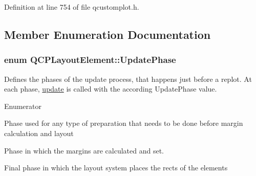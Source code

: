 Definition at line 754 of file qcustomplot.\+h.



\subsection{Member Enumeration Documentation}
\hypertarget{class_q_c_p_layout_element_a0d83360e05735735aaf6d7983c56374d}{}
\subsubsection[{Update\+Phase}]{\setlength{\rightskip}{0pt plus 5cm}enum {\bf Q\+C\+P\+Layout\+Element\+::\+Update\+Phase}}\label{class_q_c_p_layout_element_a0d83360e05735735aaf6d7983c56374d}
Defines the phases of the update process, that happens just before a replot. At each phase, \hyperlink{class_q_c_p_layout_element_a929c2ec62e0e0e1d8418eaa802e2af9b}{update} is called with the according Update\+Phase value. \begin{Desc}
\item[Enumerator]\par
\begin{description}
\item[{\em 
\hypertarget{class_q_c_p_layout_element_a0d83360e05735735aaf6d7983c56374dad6119882eba136357c2f627992e527d3}{}up\+Preparation\label{class_q_c_p_layout_element_a0d83360e05735735aaf6d7983c56374dad6119882eba136357c2f627992e527d3}
}]Phase used for any type of preparation that needs to be done before margin calculation and layout \item[{\em 
\hypertarget{class_q_c_p_layout_element_a0d83360e05735735aaf6d7983c56374da288cb59a92280e47261a341f2813e676}{}up\+Margins\label{class_q_c_p_layout_element_a0d83360e05735735aaf6d7983c56374da288cb59a92280e47261a341f2813e676}
}]Phase in which the margins are calculated and set. \item[{\em 
\hypertarget{class_q_c_p_layout_element_a0d83360e05735735aaf6d7983c56374da5d1ccf5d79967c232c3c511796860045}{}up\+Layout\label{class_q_c_p_layout_element_a0d83360e05735735aaf6d7983c56374da5d1ccf5d79967c232c3c511796860045}
}]Final phase in which the layout system places the rects of the elements \end{description}
\end{Desc}


